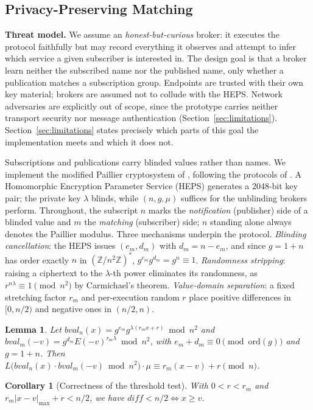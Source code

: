 \documentclass[10pt]{article}
\newtheorem{lemma}{Lemma}
\newtheorem{corollary}{Corollary}
\begin{document}
\subsection{Privacy-Preserving Matching}
\label{sec:privacy}

\textbf{Threat model.} We assume an \emph{honest-but-curious} broker: it executes the protocol faithfully but may record everything it observes and attempt to infer which service a given subscriber is interested in. The design goal is that a broker learn neither the subscribed name nor the published name, only whether a publication matches a subscription group. Endpoints are trusted with their own key material; brokers are assumed not to collude with the HEPS. Network adversaries are explicitly out of scope, since the prototype carries neither transport security nor message authentication (Section~\ref{sec:limitations}). Section~\ref{sec:limitations} states precisely which parts of this goal the implementation meets and which it does not.

Subscriptions and publications carry blinded values rather than names. We implement the modified Paillier cryptosystem of \citet{rio2026dnspplus}, following the protocols of \citet{nabeel2012efficient}. A Homomorphic Encryption Parameter Service (HEPS) generates a 2048-bit key pair; the private key $\lambda$ blinds, while $(n, g, \mu)$ suffices for the unblinding brokers perform. Throughout, the subscript $n$ marks the \emph{notification} (publisher) side of a blinded value and $m$ the \emph{matching} (subscriber) side; $n$ standing alone always denotes the Paillier modulus. Three mechanisms underpin the protocol. \emph{Blinding cancellation}: the HEPS issues $(e_m, d_m)$ with $d_m = n - e_m$, and since $g = 1+n$ has order exactly $n$ in $(\mathbb{Z}/n^2\mathbb{Z})^*$, $g^{e_m}g^{d_m} = g^n \equiv 1$. \emph{Randomness stripping}: raising a ciphertext to the $\lambda$-th power eliminates its randomness, as $r^{n\lambda} \equiv 1 \pmod{n^2}$ by Carmichael's theorem. \emph{Value-domain separation}: a fixed stretching factor $r_m$ and per-execution random $r$ place positive differences in $[0, n/2)$ and negative ones in $(n/2, n)$.

\begin{lemma}
\label{lem:match}
Let $bval_n(x) = g^{e_m} g^{\lambda(r_m x + r)} \bmod n^2$ and $bval_m(-v) = g^{d_m} E(-v)^{r_m \lambda} \bmod n^2$, with $e_m + d_m \equiv 0 \pmod{\mathrm{ord}(g)}$ and $g = 1+n$. Then $L\big(bval_n(x) \cdot bval_m(-v) \bmod n^2\big) \cdot \mu \equiv r_m(x - v) + r \pmod{n}$.
\end{lemma}
\begin{corollary}[Correctness of the threshold test]
\label{cor:threshold}
With $0 < r < r_m$ and $r_m|x-v|_{\max} + r < n/2$, we have $\textit{diff} < n/2 \iff x \ge v$.
\end{corollary}
\end{document}
